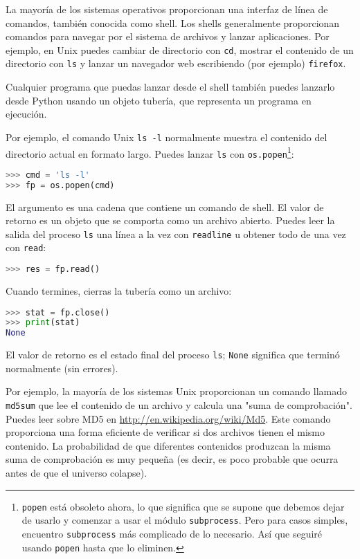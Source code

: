 La mayoría de los sistemas operativos proporcionan una interfaz de línea de comandos, también conocida como shell. Los shells generalmente proporcionan comandos para navegar por el sistema de archivos y lanzar aplicaciones. Por ejemplo, en Unix puedes cambiar de directorio con \texttt{cd}, mostrar el contenido de un directorio con \texttt{ls} y lanzar un navegador web escribiendo (por ejemplo) \texttt{firefox}.

Cualquier programa que puedas lanzar desde el shell también puedes lanzarlo desde Python usando un objeto tubería, que representa un programa en ejecución.

Por ejemplo, el comando Unix \texttt{ls -l} normalmente muestra el contenido del directorio actual en formato largo. Puedes lanzar \texttt{ls} con \texttt{os.popen}\footnote{\texttt{popen} está obsoleto ahora, lo que significa que se supone que debemos dejar de usarlo y comenzar a usar el módulo \texttt{subprocess}. Pero para casos simples, encuentro \texttt{subprocess} más complicado de lo necesario. Así que seguiré usando \texttt{popen} hasta que lo eliminen.}:

\begin{lstlisting}[language=Python]
>>> cmd = 'ls -l'
>>> fp = os.popen(cmd)
\end{lstlisting}

El argumento es una cadena que contiene un comando de shell. El valor de retorno es un objeto que se comporta como un archivo abierto. Puedes leer la salida del proceso \texttt{ls} una línea a la vez con \texttt{readline} u obtener todo de una vez con \texttt{read}:

\begin{lstlisting}[language=Python]
>>> res = fp.read()
\end{lstlisting}

Cuando termines, cierras la tubería como un archivo:

\begin{lstlisting}[language=Python]
>>> stat = fp.close()
>>> print(stat)
None
\end{lstlisting}

El valor de retorno es el estado final del proceso \texttt{ls}; \texttt{None} significa que terminó normalmente (sin errores).

Por ejemplo, la mayoría de los sistemas Unix proporcionan un comando llamado \texttt{md5sum} que lee el contenido de un archivo y calcula una "suma de comprobación". Puedes leer sobre MD5 en \url{http://en.wikipedia.org/wiki/Md5}. Este comando proporciona una forma eficiente de verificar si dos archivos tienen el mismo contenido. La probabilidad de que diferentes contenidos produzcan la misma suma de comprobación es muy pequeña (es decir, es poco probable que ocurra antes de que el universo colapse).

